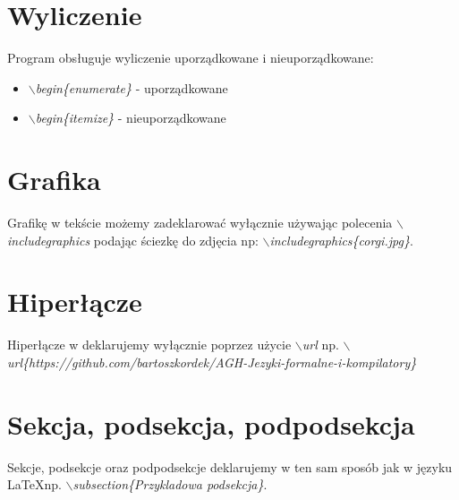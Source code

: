 \section{Wyliczenie}

Program obsługuje wyliczenie uporządkowane i nieuporządkowane:
\begin{itemize}
    \item \textit{$\backslash$begin\{enumerate\}} - uporządkowane
    \item \textit{$\backslash$begin\{itemize\}} - nieuporządkowane
\end{itemize}

\section{Grafika}
Grafikę w tekście możemy zadeklarować wyłącznie używając polecenia \textit{$\backslash$includegraphics} podając ściezkę do zdjęcia np: 
\textit{$\backslash$includegraphics\{corgi.jpg\}}.

\section{Hiperłącze}

Hiperłącze w deklarujemy wyłącznie poprzez użycie \textit{$\backslash$url} np. \textit{$\backslash$url\{https://github.com/bartoszkordek/AGH-Jezyki-formalne-i-kompilatory\}}

\section{Sekcja, podsekcja, podpodsekcja}
Sekcje, podsekcje oraz podpodsekcje deklarujemy w ten sam sposób jak 
w języku \LaTeX \space np.  \textit{$\backslash$subsection\{Przykladowa podsekcja\}}.